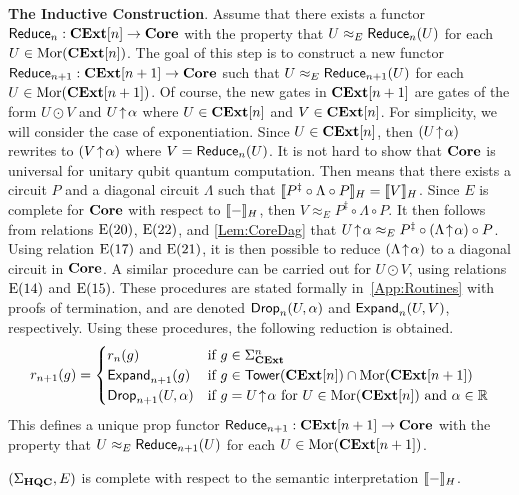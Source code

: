 \vspace{1em}
\noindent
\textbf{The Inductive Construction}.
%
Assume that there exists a functor $\mathsf{Reduce}_n: \mathbf{CExt}[n] \to \mathbf{Core}$ with the property that $U \approx_E \mathsf{Reduce}_n( U )$ for each $U \in \operatorname{Mor}( \mathbf{CExt}[n] )$. 
The goal of this step is to construct a new functor $\mathsf{Reduce}_{n+1}: \mathbf{CExt}[n+1] \to \mathbf{Core}$ such that $U \approx_E \mathsf{Reduce}_{n+1}( U )$ for each $U \in \operatorname{Mor}( \mathbf{CExt}[n+1] )$.
Of course, the new gates in $\mathbf{CExt}[n+1]$ are gates of the form $U \odot V$ and $U \!\uparrow\! \alpha$ where $U \in \mathbf{CExt}[n]$ and $V \in \mathbf{CExt}[n]$.
For simplicity, we will consider the case of exponentiation.
Since $U \in \mathbf{CExt}[n]$, then $( U \!\uparrow\! \alpha )$ rewrites to $( V \!\uparrow\! \alpha )$ where $V = \mathsf{Reduce}_n( U )$.
It is not hard to show that $\mathbf{Core}$ is universal for unitary qubit quantum computation.
Then means that there exists a circuit $P$ and a diagonal circuit $\Lambda$ such that $\llbracket P^\ddagger \circ \Lambda \circ P\rrbracket_H = \llbracket V\rrbracket_H$.
Since $E$ is complete for $\mathbf{Core}$ with respect to $\llbracket-\rrbracket_H$, then $V \approx_E P^\ddagger \circ \Lambda \circ P$.
It then follows from relations $\text{E(20)}$, $\text{E(22)}$, and \cref{Lem:CoreDag} that $U \!\uparrow\! \alpha \approx_E P^\ddagger \circ ( \Lambda \!\uparrow\! \alpha ) \circ P$.
Using relation $\text{E(17)}$ and $\text{E(21)}$, it is then possible to reduce $ ( \Lambda \!\uparrow\! \alpha )$ to a diagonal circuit in $\mathbf{Core}$.
A similar procedure can be carried out for $U \odot V$, using relations $\text{E(14)}$ and $\text{E(15)}$.
These procedures are stated formally in~\cref{App:Routines} with proofs of termination, and are denoted $\mathsf{Drop}_n( U, \alpha )$ and $\mathsf{Expand}_n( U, V )$, respectively.
Using these procedures, the following reduction is obtained.
\begin{equation*}
    r_{n+1}( g ) = \begin{cases}
        r_n( g ) & \text{if } g \in \Sigma_{\mathbf{CExt}}^n
        \\
        \mathsf{Expand}_{n+1}( g ) & \text{if } g \in \mathsf{Tower}( \mathbf{CExt}[n] ) \cap \operatorname{Mor}( \mathbf{CExt}[n + 1] )
        \\
        \mathsf{Drop}_{n+1}( U, \alpha ) & \text{if } g = U \!\uparrow\! \alpha \text{ for } U \in \operatorname{Mor}( \mathbf{CExt}[n] ) \text{ and } \alpha \in \mathbb{R}
    \end{cases}
\end{equation*}
This defines a unique prop functor $\mathsf{Reduce}_{n+1}: \mathbf{CExt}[n+1] \to \mathbf{Core}$ with the property that $U \approx_E \mathsf{Reduce}_{n+1}( U )$ for each $U \in \operatorname{Mor}( \mathbf{CExt}[n+1] )$.

\begin{theorem}
    \label{Thm:HQCComplete}
    $( \Sigma_{\mathbf{HQC}}, E )$ is complete with respect to the semantic interpretation $\llbracket-\rrbracket_H$.
\end{theorem}

